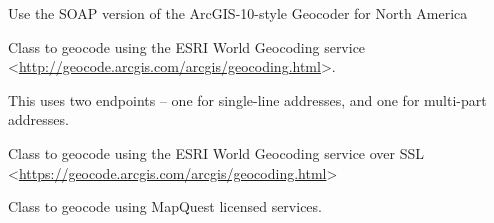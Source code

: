 \documentclass[letterpaper,10pt,english]{sphinxmanual}
\begin{document}

\begin{fulllineitems}
\label{index:omgeo.services.EsriNASoap}
Use the SOAP version of the ArcGIS-10-style Geocoder for North America

\end{fulllineitems}


\begin{fulllineitems}
\label{index:omgeo.services.EsriWGS}
Class to geocode using the ESRI World Geocoding service
\textless{}\href{http://geocode.arcgis.com/arcgis/geocoding.html}{http://geocode.arcgis.com/arcgis/geocoding.html}\textgreater{}.

This uses two endpoints -- one for single-line addresses,
and one for multi-part addresses.

\end{fulllineitems}


\begin{fulllineitems}
\label{index:omgeo.services.EsriWGSSSL}
Class to geocode using the ESRI World Geocoding service over SSL
\textless{}\href{https://geocode.arcgis.com/arcgis/geocoding.html}{https://geocode.arcgis.com/arcgis/geocoding.html}\textgreater{}

\end{fulllineitems}


\begin{fulllineitems}
\label{index:omgeo.services.MapQuest}
Class to geocode using MapQuest licensed services.

\end{fulllineitems}
\end{document}
